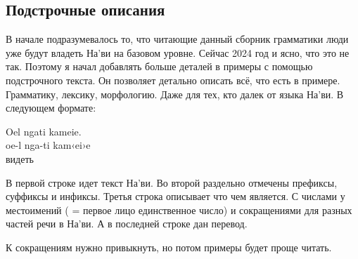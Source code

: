 \subsection{Подстрочные описания}
В начале подразумевалось то, что читающие данный сборник грамматики люди уже будут владеть На'ви на базовом уровне. Сейчас 2024 год и ясно, что это не так.
Поэтому я начал добавлять больше деталей в примеры с помощью
подстрочного текста. Он позволяет детально
описать всё, что есть в примере. Грамматику, лексику,
морфологию. Даже для тех, кто далек от языка На'ви. В следующем формате:

\begin{interlin}
 \glll Oel ngati kameie. \\
     oe-l nga-ti kam‹ei›e \\
       видеть \\
\end{interlin}

\noindent В первой строке идет текст На'ви. Во
второй раздельно отмечены префиксы, суффиксы и инфиксы. Третья строка описывает что чем является. С числами у местоимений ( =
первое лицо
единственное число) и сокращениями для разных частей речи в На'ви. А в последней строке дан перевод.

К сокращениям нужно привыкнуть, но потом примеры будет проще читать.

